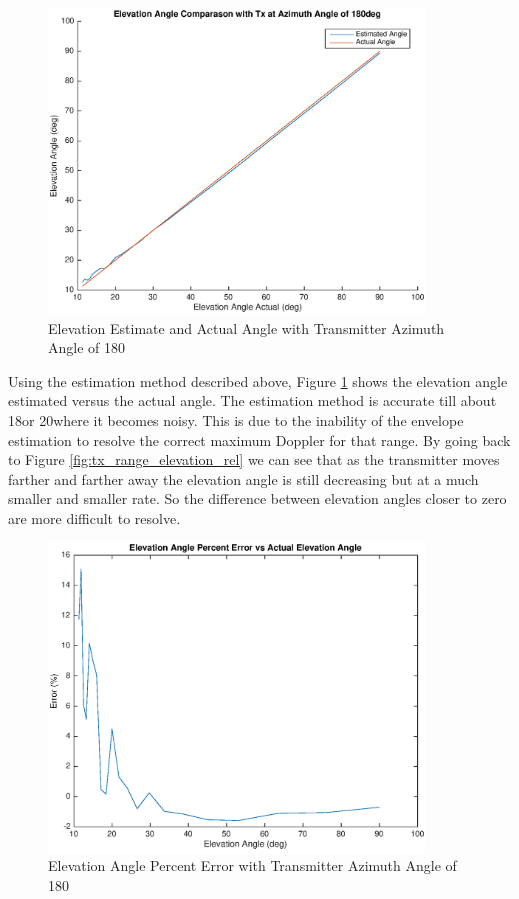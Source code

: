 \begin{figure}
	\begin{center}
		\includegraphics[width=10cm]{images/results/Elevation_angle_comparason_180deg_Azimuth.eps}
		\caption{Elevation Estimate and Actual Angle with Transmitter Azimuth Angle of 180\textdegree}
		\label{fig:angle_comparason_180deg}
	\end{center}
\end{figure}

Using the estimation method described above, Figure \ref{fig:angle_comparason_180deg} shows the elevation angle estimated versus the actual angle. The estimation method is accurate till about 18\textdegree \space or 20\textdegree \space where it becomes noisy. This is due to the inability of the envelope estimation to resolve the correct maximum Doppler for that range. By going back to Figure \ref{fig:tx_range_elevation_rel} we can see that as the transmitter moves farther and farther away the elevation angle is still decreasing but at a much smaller and smaller rate. So the difference between elevation angles closer to zero are more difficult to resolve. 

\begin{figure}
	\begin{center}
		\includegraphics[width=10cm]{images/results/Elevation_angle_percent_error_180deg_Azimuth.eps}
		\caption{Elevation Angle Percent Error with Transmitter Azimuth Angle of 180\textdegree}
		\label{fig:percent_error_elevation_180deg}
	\end{center}
\end{figure}


